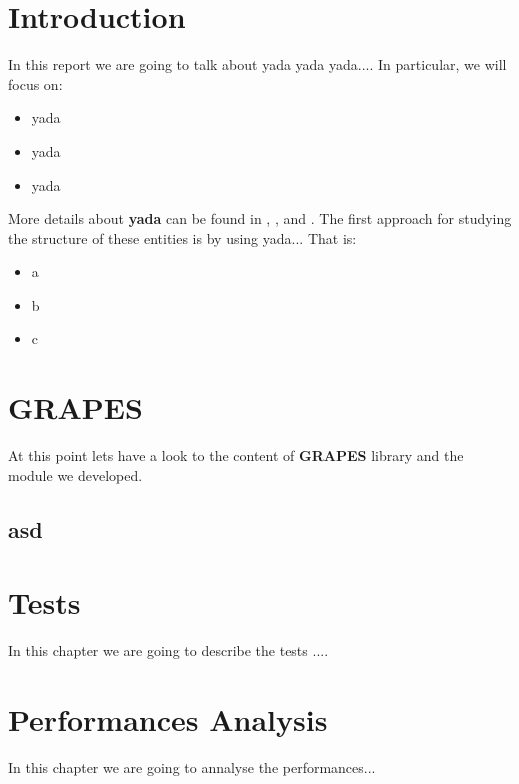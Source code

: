 \documentclass[12pt,a4paper]{report}
\begin{document}


\tableofcontents
\listoffigures

\chapter{Introduction}
\label{ch:intro}

In this report we are going to talk about yada yada yada....
In particular, we will focus on:
\begin{itemize}
  \item yada
  \item yada
  \item yada
\end{itemize}
More details about \textbf{yada} can be found in \cite{yada1}, \cite{yada2}, \cite{yada3} and
\cite{yada4}.
The first approach for studying the structure of these entities is by using yada...
That is:
\begin{itemize}
\item a
\item b
\item c
\end{itemize}


\chapter{GRAPES}
\label{ch:grapes}
At this point lets have a look to the content of \textbf{GRAPES} library and the module we developed.

\section{asd}
\label{asd}


\chapter{Tests}
\label{ch:tests}
In this chapter we are going to describe the tests ....


\chapter{Performances Analysis}
In this chapter we are going to annalyse the performances...
\end{document}
